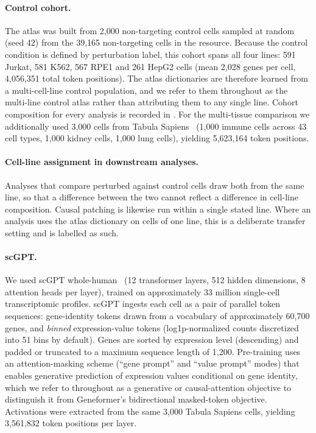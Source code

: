 \documentclass[onecolumn,11pt]{article}
\begin{document}
\paragraph{Control cohort.} The atlas was built from 2,000 non-targeting control cells sampled at
random (seed 42) from the 39,165 non-targeting cells in the resource. Because the control condition
is defined by perturbation label, this cohort spans all four lines: 591 Jurkat, 581 K562, 567 RPE1
and 261 HepG2 cells (mean 2,028 genes per cell, 4,056,351 total token positions). The atlas
dictionaries are therefore learned from a multi-cell-line control population, and we refer to them
throughout as the multi-line control atlas rather than attributing them to any single line. Cohort
composition for every analysis is recorded in . For the multi-tissue
comparison we additionally used 3,000 cells from Tabula Sapiens~\cite{tabula2022tabula} (1,000
immune cells across 43 cell types, 1,000 kidney cells, 1,000 lung cells), yielding 5,623,164 token
positions.

\paragraph{Cell-line assignment in downstream analyses.} Analyses that compare perturbed against
control cells draw both from the same line, so that a difference between the two cannot reflect a
difference in cell-line composition. Causal patching is likewise run within a single stated line.
Where an analysis uses the atlas dictionary on cells of one line, this is a deliberate transfer
setting and is labelled as such.

\paragraph{scGPT.} We used scGPT whole-human~\cite{cui2024scgpt} (12 transformer layers, 512 hidden
dimensions, 8 attention heads per layer), trained on approximately 33 million single-cell
transcriptomic profiles. scGPT ingests each cell as a pair of parallel token sequences:
gene-identity tokens drawn from a vocabulary of approximately 60,700 genes, and \emph{binned}
expression-value tokens (log1p-normalized counts discretized into 51 bins by default). Genes are
sorted by expression level (descending) and padded or truncated to a maximum sequence length of
1,200. Pre-training uses an attention-masking scheme (``gene prompt'' and ``value prompt'' modes)
that enables generative prediction of expression values conditional on gene identity, which we
refer to throughout as a generative or causal-attention objective to distinguish it from
Geneformer's bidirectional masked-token objective. Activations were extracted from the same 3,000
Tabula Sapiens cells, yielding 3,561,832 token positions per layer.
\end{document}
